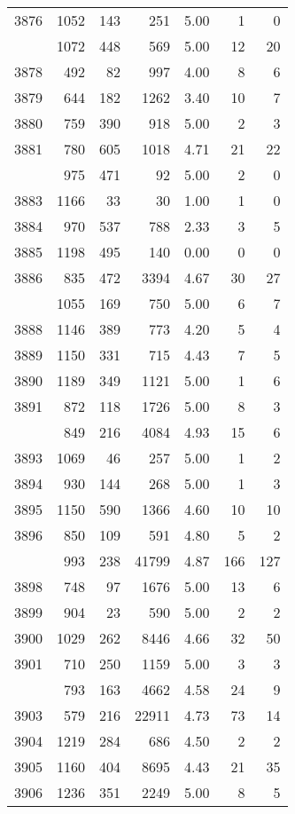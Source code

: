 \documentclass[
]{article}
\begin{document}
\begin{table}
\begin{tabular}[t]{lrrrrrr}
3876 & 1052 & 143 & 251 & 5.00 & 1 & 0\\
\addlinespace
3877 & 1072 & 448 & 569 & 5.00 & 12 & 20\\
3878 & 492 & 82 & 997 & 4.00 & 8 & 6\\
3879 & 644 & 182 & 1262 & 3.40 & 10 & 7\\
3880 & 759 & 390 & 918 & 5.00 & 2 & 3\\
3881 & 780 & 605 & 1018 & 4.71 & 21 & 22\\
\addlinespace
3882 & 975 & 471 & 92 & 5.00 & 2 & 0\\
3883 & 1166 & 33 & 30 & 1.00 & 1 & 0\\
3884 & 970 & 537 & 788 & 2.33 & 3 & 5\\
3885 & 1198 & 495 & 140 & 0.00 & 0 & 0\\
3886 & 835 & 472 & 3394 & 4.67 & 30 & 27\\
\addlinespace
3887 & 1055 & 169 & 750 & 5.00 & 6 & 7\\
3888 & 1146 & 389 & 773 & 4.20 & 5 & 4\\
3889 & 1150 & 331 & 715 & 4.43 & 7 & 5\\
3890 & 1189 & 349 & 1121 & 5.00 & 1 & 6\\
3891 & 872 & 118 & 1726 & 5.00 & 8 & 3\\
\addlinespace
3892 & 849 & 216 & 4084 & 4.93 & 15 & 6\\
3893 & 1069 & 46 & 257 & 5.00 & 1 & 2\\
3894 & 930 & 144 & 268 & 5.00 & 1 & 3\\
3895 & 1150 & 590 & 1366 & 4.60 & 10 & 10\\
3896 & 850 & 109 & 591 & 4.80 & 5 & 2\\
\addlinespace
3897 & 993 & 238 & 41799 & 4.87 & 166 & 127\\
3898 & 748 & 97 & 1676 & 5.00 & 13 & 6\\
3899 & 904 & 23 & 590 & 5.00 & 2 & 2\\
3900 & 1029 & 262 & 8446 & 4.66 & 32 & 50\\
3901 & 710 & 250 & 1159 & 5.00 & 3 & 3\\
\addlinespace
3902 & 793 & 163 & 4662 & 4.58 & 24 & 9\\
3903 & 579 & 216 & 22911 & 4.73 & 73 & 14\\
3904 & 1219 & 284 & 686 & 4.50 & 2 & 2\\
3905 & 1160 & 404 & 8695 & 4.43 & 21 & 35\\
3906 & 1236 & 351 & 2249 & 5.00 & 8 & 5\\

\end{tabular}
\end{table}
\end{document}
